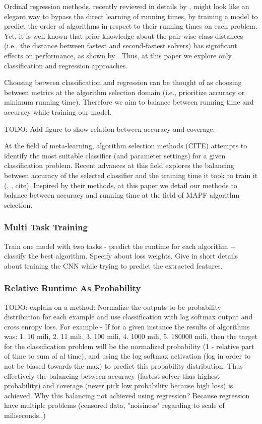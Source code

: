 \documentclass[letterpaper]{article} %
\newcommand\Roni[1]{\nb{\textbf{Roni:}}{red}{#1}}
\begin{document}
Ordinal regression methods, recently reviewed in details by \cite{gutierrez2015ordinal}, might look like an elegant way to bypass the direct learning of running times, by training a model to predict the order of algorithms in respect to their running times on each problem. Yet, it is well-known that prior knowledge about the pair-wise class distances (i.e., the distance between fastest and second-fastest solvers) has significant effects on performance, as shown by \cite{sanchez2013exploitation}. Thus, at this paper we explore only classification and regression approaches.

Choosing between classification and regression can be thought of as choosing between metrics at the algorithm selection domain (i.e., prioritize accuracy or minimum running time). Therefore we aim to balance between running time and accuracy while training our model.

TODO: Add figure to show relation between accuracy and coverage.


At the field of meta-learning, algorithm selection methods (CITE) attempts to identify the most suitable classifier (and parameter settings) for a given classification problem. Recent advances at this field explores the balancing between accuracy of the selected classifier and the training time it took to train it (\cite{brazdil2003ranking}, \cite{}, cite{}). Inspired by their methods, at this paper we detail our methods to balance between accuracy and running time at the field of MAPF algorithm selection.

\subsubsection{Multi Task Training}
Train one model with two tasks - predict the runtime for each algorithm + classify the best algorithm. Specify about loss weights.
Give in short details about training the CNN while trying to predict the extracted features.

\subsubsection{Relative Runtime As Probability}
TODO: explain on a method: Normalize the outputs to be probability distribution for each example and use classification with log softmax output and cross enropy loss.
For example - If for a given instance the results of algorithms was: 1. 10 mili, 2. 11 mili, 3. 100 mili, 4. 1000 mili, 5. 180000 mili, then the target for the classification problem will be the normalized probability (1 - relative part of time to sum of al time), and using the log softmax activation (log in order to not be biased towards the max) to predict this probability distribution. Thus effectively the balancing between accuracy (fastest solver thus highest probability) and coverage (never pick low probability because high loss) is achieved.
Why this balancing not achieved using regression? Because regression have multiple problems (censored data, "noisiness" regarding to scale of miliseconds..)
\Roni{Do we have experiments for this?}
\end{document}
